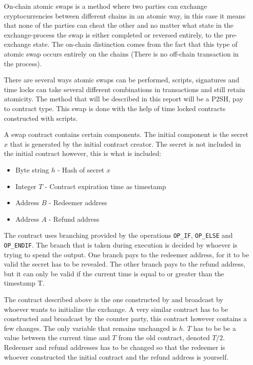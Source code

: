 On-chain atomic swaps is a method where two parties can exchange cryptocurrencies between different chains in an atomic way, in this case it means that none of the parties can cheat the other and no matter what state in the exchange-process the swap is either completed or reversed entirely, to the pre-exchange state. The on-chain distinction comes from the fact that this type of atomic swap occurs entirely on the chains (There is no off-chain transaction in the process).

There are several ways atomic swaps can be performed, scripts, signatures and time locks can take several different combinations in transactions and still retain atomicity. The method that will be described in this report will be a P2SH, pay to contract type. This swap is done with the help of time locked contracts constructed with scripts. 

A swap contract contains certain components. The initial component is the secret $x$ that is generated by the initial contract creator. The secret is not included in the initial contract however, this is what is included:
\begin{itemize}
	\item Byte string $h$ \quad - \quad Hash of secret $x$
	\item Integer $T$ \quad\quad - \quad Contract expiration time as timestamp
	\item Address $B$ \quad - \quad Redeemer address
	\item Address $A$ \quad - \quad Refund address
\end{itemize}

The contract uses branching provided by the operations \texttt{OP\_IF}, \texttt{OP\_ELSE} and \texttt{OP\_ENDIF}. The branch that is taken during execution is decided by whoever is trying to spend the output. One branch pays to the redeemer address, for it to be valid the secret has to be revealed. The other branch pays to the refund address, but it can only be valid if the current time is equal to or greater than the timestamp T.

The contract described above is the one constructed by and broadcast by whoever wants to initialize the exchange. A very similar contract has to be constructed and broadcast by the counter party, this contract however contains a few changes. The only variable that remains unchanged is $h$. $T$ has to be be a value between the current time and $T$ from the old contract, denoted $T/2$. Redeemer and refund addresses has to be changed so that the redeemer is whoever constructed the initial contract and the refund address is yourself.

